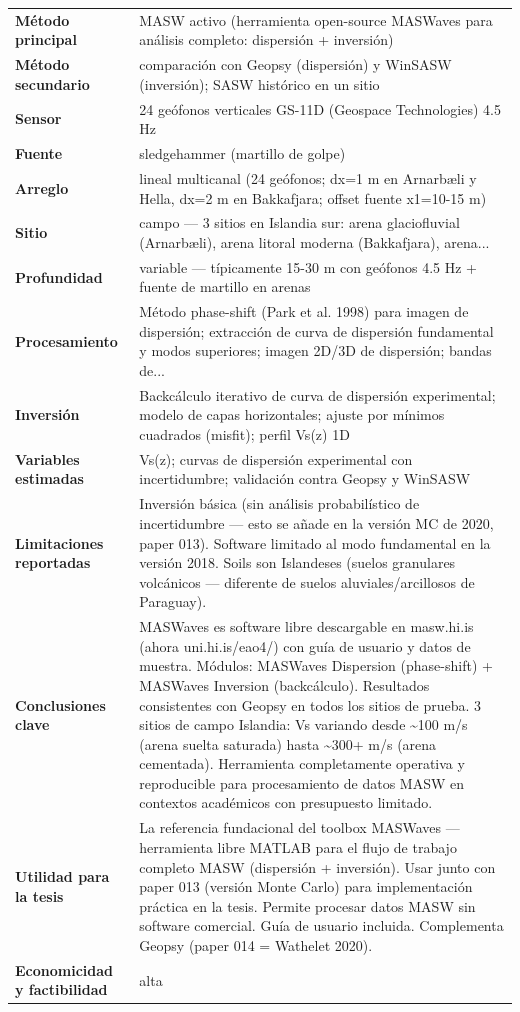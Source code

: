 \begin{center}\scriptsize
\begin{tabularx}{\textwidth}{@{}>{\bfseries}p{3.3cm} X@{}}
\toprule
M\'etodo principal & MASW activo (herramienta open-source MASWaves para análisis completo: dispersión + inversión) \\
M\'etodo secundario & comparación con Geopsy (dispersión) y WinSASW (inversión); SASW histórico en un sitio \\
Sensor & 24 geófonos verticales GS-11D (Geospace Technologies) 4.5 Hz \\
Fuente & sledgehammer (martillo de golpe) \\
Arreglo & lineal multicanal (24 geófonos; dx=1 m en Arnarbæli y Hella, dx=2 m en Bakkafjara; offset fuente x1=10-15 m) \\
Sitio & campo --- 3 sitios en Islandia sur: arena glaciofluvial (Arnarbæli), arena litoral moderna (Bakkafjara), arena... \\
Profundidad & variable --- típicamente 15-30 m con geófonos 4.5 Hz + fuente de martillo en arenas \\
Procesamiento & Método phase-shift (Park et al. 1998) para imagen de dispersión; extracción de curva de dispersión fundamental y modos superiores; imagen 2D/3D de dispersión; bandas de... \\
Inversi\'on & Backcálculo iterativo de curva de dispersión experimental; modelo de capas horizontales; ajuste por mínimos cuadrados (misfit); perfil Vs(z) 1D \\
Variables estimadas & Vs(z); curvas de dispersión experimental con incertidumbre; validación contra Geopsy y WinSASW \\
Limitaciones reportadas & Inversión básica (sin análisis probabilístico de incertidumbre --- esto se añade en la versión MC de 2020, paper 013). Software limitado al modo fundamental en la versión 2018. Soils son Islandeses (suelos granulares volcánicos --- diferente de suelos aluviales/arcillosos de Paraguay). \\
Conclusiones clave & MASWaves es software libre descargable en masw.hi.is (ahora uni.hi.is/eao4/) con guía de usuario y datos de muestra. Módulos: MASWaves Dispersion (phase-shift) + MASWaves Inversion (backcálculo). Resultados consistentes con Geopsy en todos los sitios de prueba. 3 sitios de campo Islandia: Vs variando desde \textasciitilde{}100 m/s (arena suelta saturada) hasta \textasciitilde{}300+ m/s (arena cementada). Herramienta completamente operativa y reproducible para procesamiento de datos MASW en contextos académicos con presupuesto limitado. \\
Utilidad para la tesis & La referencia fundacional del toolbox MASWaves --- herramienta libre MATLAB para el flujo de trabajo completo MASW (dispersión + inversión). Usar junto con paper 013 (versión Monte Carlo) para implementación práctica en la tesis. Permite procesar datos MASW sin software comercial. Guía de usuario incluida. Complementa Geopsy (paper 014 = Wathelet 2020). \\
Economicidad y factibilidad & alta \\
\bottomrule
\end{tabularx}
\end{center}

